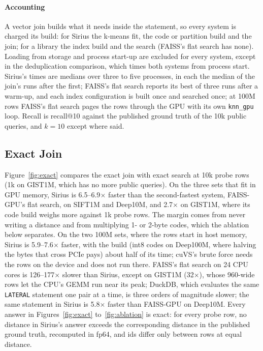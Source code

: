 \paragraph{Accounting}
A vector join builds what it needs inside the statement, so every system is charged its build: for Sirius the k-means fit, the code or partition build and the join; for a library the index build and the search (FAISS's flat search has none).
Loading from storage and process start-up are excluded for every system, except in the deduplication comparison, which times both systems from process start.
Sirius's times are medians over three to five processes, in each the median of the join's runs after the first; FAISS's flat search reports its best of three runs after a warm-up, and each index configuration is built once and searched once; at 100M rows FAISS's flat search pages the rows through the GPU with its own \texttt{knn\_gpu} loop.
Recall is recall@10 against the published ground truth of the 10k public queries, and $k{=}10$ except where said.

\subsection{Exact Join}\label{subsec:eval-exact}



Figure~\ref{fig:exact} compares the exact join with exact search at 10k probe rows (1k on GIST1M, which has no more public queries).
On the three sets that fit in GPU memory, Sirius is 6.5--6.9$\times$ faster than the second-fastest system, FAISS-GPU's flat search, on SIFT1M and Deep10M, and 2.7$\times$ on GIST1M, where its code build weighs more against 1k probe rows.
The margin comes from never writing a distance and from multiplying 1- or 2-byte codes, which the ablation below separates.
On the two 100M sets, where the rows start in host memory, Sirius is 5.9--7.6$\times$ faster, with the build (int8 codes on Deep100M, where halving the bytes that cross PCIe pays) about half of its time; cuVS's brute force needs the rows on the device and does not run there.
FAISS's flat search on 24 CPU cores is 126--177$\times$ slower than Sirius, except on GIST1M (32$\times$), whose 960-wide rows let the CPU's GEMM run near its peak; DuckDB, which evaluates the same \texttt{LATERAL} statement one pair at a time, is three orders of magnitude slower; the same statement in Sirius is 5.8$\times$ faster than FAISS-GPU on Deep10M.
Every answer in Figures~\ref{fig:exact} to~\ref{fig:ablation} is exact: for every probe row, no distance in Sirius's answer exceeds the corresponding distance in the published ground truth, recomputed in fp64, and ids differ only between rows at equal distance.

